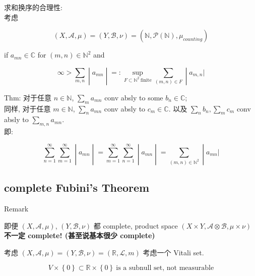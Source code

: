 \documentclass{qlnotes-export}
\begin{document}
\begin{example}\label{ex-06-product-measure-fubini-tonelli-example-003}

求和换序的合理性:\\
考虑

\[(X,\mathcal{A},\mu) = (Y,\mathcal{B},\nu) = ({\mathbb{N}},\mathcal{P}({\mathbb{N}}),\mu_{counting})\]

if \(a_{mn} \in {\mathbb{C}}\) for \((m,n) \in {\mathbb{N}}^{2}\) and

\[\left. \infty > \sum\limits_{m,n} \middle| a_{mn} \middle| = :\sup\limits_{F \subset {\mathbb{N}}^{2}\ \text{finite}}\sum\limits_{(m,n) \in F} \middle| a_{m,n}| \right.\]

Thm: 对于任意 \(n \in {\mathbb{N}}\), \(\sum_{m}a_{mn}\) conv absly to some \(b_{n} \in {\mathbb{C}}\);\\
同样, 对于任意 \(m \in {\mathbb{N}}\), \(\sum_{n}a_{mn}\) conv absly to \(c_{m} \in {\mathbb{C}}\). 以及 \(\sum_{n}b_{n},\sum_{m}c_{m}\) conv absly to \(\sum_{m,n}a_{mn}\).\\
即:

\[\left. \sum\limits_{n = 1}^{\infty}\sum\limits_{m = 1}^{\infty} \middle| a_{mn} \middle| = \sum\limits_{m = 1}^{\infty}\sum\limits_{n = 1}^{\infty} \middle| a_{mn} \middle| = \sum\limits_{(m,n) \in {\mathbb{N}}^{2}} \middle| a_{mn}| \right.\]

\end{example}

\subsection{complete Fubini's Theorem}\label{complete-fubinis-theorem}

\begin{qlremark}{Remark}

即便 \((X,\mathcal{A},\mu)\), \((Y,\mathcal{B},\nu)\) 都 complete, product space \((X \times Y,\mathcal{A} \otimes \mathcal{B},\mu \times \nu)\) \textbf{不一定 complete! (甚至说基本很少 complete)}

\end{qlremark}

\begin{example}\label{ex-06-product-measure-fubini-tonelli-example-004}

考虑 \((X,\mathcal{A},\mu) = (Y,\mathcal{B},\nu) = ({\mathbb{R}},\mathcal{L},m)\) 考虑一个 Vitali set.

\[V \times \left\{ 0 \right\} \subset {\mathbb{R}} \times \left\{ 0 \right\}\ \text{is a subnull set, not measurable}\]

\end{example}
\end{document}
